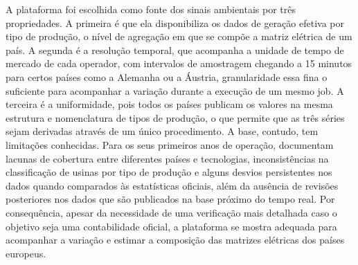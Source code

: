 A plataforma foi escolhida como fonte dos sinais ambientais por três propriedades. A primeira é que ela disponibiliza
os dados de geração efetiva por tipo de produção, o nível de agregação em que se compõe 
a matriz elétrica de um país. A segunda é a resolução temporal, que acompanha a unidade de tempo de mercado de cada operador, 
com intervalos de amostragem chegando a 15 minutos para certos países como a Alemanha ou a Áustria, 
granularidade essa fina o suficiente para acompanhar a variação durante a execução de um mesmo job.
A terceira é a uniformidade, pois todos os países publicam os valores na mesma estrutura e nomenclatura de tipos de produção, 
o que permite que as três séries sejam derivadas através de um único procedimento. A base, contudo, tem limitações conhecidas. 
Para os seus primeiros anos de operação, \textcite{entsoe-limitations} documentam lacunas de cobertura
entre diferentes países e tecnologias, inconsistências na classificação de usinas por tipo de produção e alguns desvios persistentes
nos dados quando comparados às estatísticas oficiais, além da ausência de revisões posteriores nos dados que são publicados na
base próximo do tempo real. Por consequência, apesar da necessidade de uma verificação mais detalhada caso o objetivo seja uma contabilidade oficial,
a plataforma se mostra adequada para acompanhar a variação e estimar a composição das matrizes elétricas dos países
europeus.  

